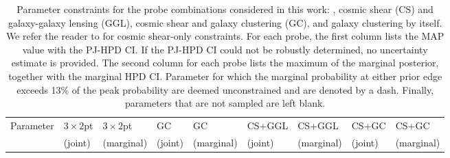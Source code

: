 \begin{landscape}
\begin{table}
\begin{center}
\caption{Parameter constraints for the probe combinations considered in this work: \tttp, cosmic shear (CS) and galaxy-galaxy lensing (GGL), cosmic shear and galaxy clustering (GC), and galaxy clustering by itself. 
We refer the reader to \citet{asgari/etal:inprep} for cosmic shear-only constraints. 
For each probe, the first column lists the MAP value with the PJ-HPD CI. 
If the PJ-HPD CI could not be robustly determined, no uncertainty estimate is provided. 
The second column for each probe lists the maximum of the marginal posterior, together with the marginal HPD CI. 
Parameter for which the marginal probability at either prior edge exceeds 13\% of the peak probability are deemed unconstrained and are denoted by a dash. 
Finally, parameters that are not sampled are left blank.
\label{tab:fullparams}}
\begin{tabular}{lllllllll}
    \toprule
    Parameter    & $3\times2$pt & $3\times2$pt& GC & GC& CS+GGL & CS+GGL& CS+GC & CS+GC \\ 
             & (joint) & (marginal)& (joint) & (marginal)& (joint) & (marginal)& (joint) & (marginal) \\ 


\end{tabular}
\end{center}
\end{table}
\end{landscape}
